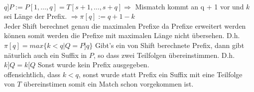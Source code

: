 \documentclass{article}
\begin{document}
\begin{flushleft}
\begin{enumerate}[(a)]
    \newline \\
    $q] P := P[ 1,\dots,q]  = T[ s + 1,\dots,s + q] \Longrightarrow$ Mismatch kommt an q + 1 vor und $k$ sei Länge der Prefix.
    $\Longrightarrow \pi[q] := q + 1 - k$ 
    \newline \\
    Jeder Shift berechnet genau die maximalen Prefixe da Prefixe erweitert werden können somit werden die Prefixe mit maximalen Länge
    nicht übersehen. D.h. $\pi[q] = max\{k < q | Q = P]q\}$
    Gibt's ein von Shift berechnete Prefix, dann gibt näturlich auch ein Suffix in $P$, so dass zwei Teilfolgen übereinstimmen. D.h. 
    $k]Q = k[Q$ Sonst wurde kein Prefix ausgegeben.
    \newline \\
    offensichtlich, dass $k < q$, sonst wurde statt Prefix ein Suffix mit eine Teilfolge von $T$ übereinstimen somit ein Match schon vorgekommen ist.  
\end{enumerate}
\end{flushleft}
\end{document}
